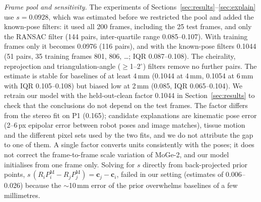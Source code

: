 \documentclass[conference]{IEEEtran}
\begin{document}
\emph{Frame pool and sensitivity.} The experiments of Sections~\ref{sec:results}--\ref{sec:explain} use $s{=}0.0928$, which was estimated before we restricted the pool and added the known-pose filters: it used all 200 frames, including the 25 test frames, and only the RANSAC filter (144 pairs, inter-quartile range 0.085--0.107). With training frames only it becomes 0.0976 (116 pairs), and with the known-pose filters 0.1044 (51 pairs, 35 training frames 801, 806, \dots; IQR 0.087--0.108). The cheirality, reprojection and triangulation-angle ($\geq$1--2$^\circ$) filters remove no further pairs. The estimate is stable for baselines of at least 4\,mm (0.1044 at 4\,mm, 0.1054 at 6\,mm with IQR 0.105--0.108) but biased low at 2\,mm (0.085, IQR 0.065--0.104). We retrain our model with the held-out-clean factor 0.1044 in Section~\ref{sec:results} to check that the conclusions do not depend on the test frames. The factor differs from the stereo fit on P1 (0.165); candidate explanations are kinematic pose error (2--6\,px epipolar error between robot poses and image matches), tissue motion and the different pixel sets used by the two fits, and we do not attribute the gap to one of them. A single factor converts units consistently with the poses; it does not correct the frame-to-frame scale variation of MoGe-2, and our model initialises from one frame only. Solving for $s$ directly from back-projected prior points, $s\,(R_iP^{\mathrm{M}}_i-R_jP^{\mathrm{M}}_j)=\mathbf{c}_j-\mathbf{c}_i$, failed in our setting (estimates of 0.006--0.026) because the $\sim$10\,mm error of the prior overwhelms baselines of a few millimetres.
\end{document}
